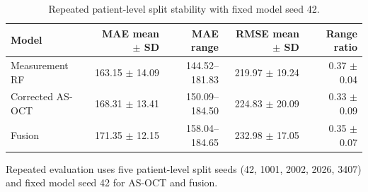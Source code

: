 \begin{table}[t]
\centering
\caption{Repeated patient-level split stability with fixed model seed 42.}
\label{tab:repeated_stability}
\begin{tabular}{lrrrr}
\toprule
Model & MAE mean $\pm$ SD & MAE range & RMSE mean $\pm$ SD & Range ratio \\
\midrule
Measurement RF & 163.15 $\pm$ 14.09 & 144.52--181.83 & 219.97 $\pm$ 19.24 & 0.37 $\pm$ 0.04 \\
Corrected AS-OCT & 168.31 $\pm$ 13.41 & 150.09--184.50 & 224.83 $\pm$ 20.09 & 0.33 $\pm$ 0.09 \\
Fusion & 171.35 $\pm$ 12.15 & 158.04--184.65 & 232.98 $\pm$ 17.05 & 0.35 $\pm$ 0.07 \\
\bottomrule
\end{tabular}
\footnotesize Repeated evaluation uses five patient-level split seeds (42, 1001, 2002, 2026, 3407) and fixed model seed 42 for AS-OCT and fusion.
\end{table}
